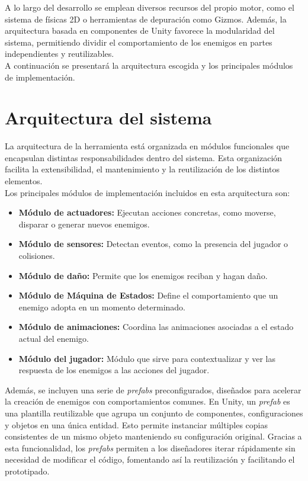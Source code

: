 A lo largo del desarrollo se emplean diversos recursos del propio motor, como el sistema de físicas 2D o herramientas de depuración como Gizmos. Además, la arquitectura basada en componentes de Unity favorece la modularidad del sistema, permitiendo dividir el comportamiento de los enemigos en partes independientes y reutilizables.\\

A continuación se presentará la arquitectura escogida y los principales módulos de implementación.

\section{Arquitectura del sistema}
La arquitectura de la herramienta está organizada en módulos funcionales que encapsulan distintas responsabilidades dentro del sistema. Esta organización facilita la extensibilidad, el mantenimiento y la reutilización de los distintos elementos.\\

Los principales módulos de implementación incluidos en esta arquitectura son:
\begin{itemize}
\item \textbf{Módulo de actuadores:} Ejecutan acciones concretas, como moverse, disparar o generar nuevos enemigos. 
\item \textbf{Módulo de sensores:} Detectan eventos, como la presencia del jugador o colisiones.
\item \textbf{Módulo de daño:} Permite que los enemigos reciban y hagan daño.
\item \textbf{Módulo de Máquina de Estados:} Define el comportamiento que un enemigo adopta en un momento determinado.
\item \textbf{Módulo de animaciones:} Coordina las animaciones asociadas a el estado actual del enemigo.
\item \textbf{Módulo del jugador:} Módulo que sirve para contextualizar y ver las respuesta de los enemigos a las acciones del jugador.
\end{itemize}

Además, se incluyen una serie de \textit{prefabs} preconfigurados, diseñados para acelerar la creación de enemigos con comportamientos comunes. En Unity, un \textit{prefab} es una plantilla reutilizable que agrupa un conjunto de componentes, configuraciones y objetos en una única entidad. Esto permite instanciar múltiples copias consistentes de un mismo objeto manteniendo su configuración original. Gracias a esta funcionalidad, los \textit{prefabs} permiten a los diseñadores iterar rápidamente sin necesidad de modificar el código, fomentando así la reutilización y facilitando el prototipado.\\

